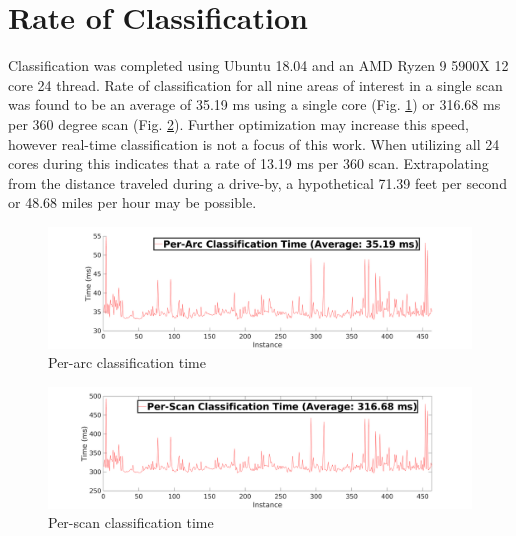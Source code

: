 \documentclass[numbered,pdftex]{ohio-etd}
\begin{document}
{{{		%
		
		
		
	
	}



	\section{Rate of Classification}{
		
		{Classification was completed using Ubuntu 18.04 and an AMD Ryzen 9 5900X 12 core 24 thread. Rate of classification for all nine areas of interest in a single scan was found to be an average of 35.19 ms using a single core (Fig. \ref{fig:per_arc_classification_time}) or 316.68 ms per 360 degree scan (Fig. \ref{fig:per_scan_classification_rate}). Further optimization may increase this speed, however real-time classification is not a focus of this work. When utilizing all 24 cores during this indicates that a rate of 13.19 ms per 360 scan. Extrapolating from the distance traveled during a drive-by, a hypothetical 71.39 feet per second or 48.68 miles per hour may be possible.}
		
		\begin{figure}[H]
			\centering
			\includegraphics[width=0.9\linewidth]{Defense_Images/per_arc_classification_time}
			\caption[Per-Arc Time]{Per-arc classification time}
			\label{fig:per_arc_classification_time}
		\end{figure}
		
		\begin{figure}[H]
			\centering
			\includegraphics[width=0.9\linewidth]{Defense_Images/per_scan_classification_rate}
			\caption[Per-Scan Time]{Per-scan classification time}
			\label{fig:per_scan_classification_rate}
		\end{figure}
		
}}}
\end{document}
